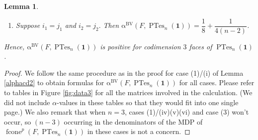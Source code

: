 \documentclass[12pt]{amsart}
\numberwithin{equation}{section}
\newtheorem{lem}[thm]{Lemma}
\theoremstyle{definition}
\def\ptes{\operatorname{PTes}}
\def\fcone{\operatorname{fcone}}
\def\1{{\boldsymbol{1}}}
\def\bvalpha{\operatorname{\alpha^{BV}}}
\begin{document}
\begin{lem}
\begin{enumerate}[leftmargin=*, label={\rm (\arabic*)}]
\begin{enumerate}[label={\rm (\roman*)}]
            \item If $(i_{2},j_{2})$ is on the column of either the $l$-th hook or the $m$-th hook but is not on the hook of the other, 
	      then $\bvalpha(F,\ptes_{n}(\boldsymbol{1}))=\dfrac{1}{8} - \dfrac{n^2 - 3n + 3}{24(n^2-3n+2)}$. 

             \item If $(i_{2},j_{2})$ is on the column of either the $l$-th hook or the $m$-th hook and is on the row of the other hook, then $\bvalpha(F,\ptes_{n}(\boldsymbol{1}))=\dfrac{1}{8}$.
        \end{enumerate}
    \item Suppose $i_1=j_1$ and $i_2=j_2.$ Then $\bvalpha(F,\ptes_{n}(\boldsymbol{1}))=\dfrac{1}{8}+\dfrac{1}{4(n-2)}$.
    \end{enumerate}
Hence, $\bvalpha(F,\ptes_{n}(\boldsymbol{1}))$ is positive for codimension $3$ faces of $\ptes_n(\1)$.
\end{lem}


\begin{proof}
  We follow the same procedure as in the proof for case (1)/(i) of Lemma \ref{alphacd2} to obtain formulas for $\bvalpha(F,\ptes_{n}(\boldsymbol{1}))$ for all cases. Please refer to tables in Figure \ref{fig:data3} for all the matrices involved in the calculation. (We did not include $\alpha$-values in these tables so that they would fit into one single page.) We also remark that when $n=3$, cases (1)/(iv)(v)(vi) and case (3) won't occur, so $(n-3)$ occurring in the denominators of the MDP of $\fcone^p(F, \ptes_n(\1))$ in these cases is not a concern.
\end{proof}
\end{document}
